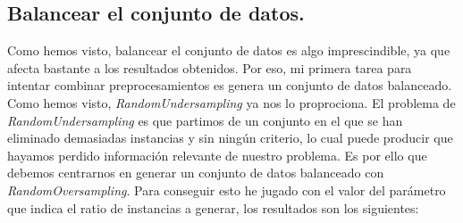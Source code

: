 \documentclass[11pt]{article}
\begin{document}
\subsection{Balancear el conjunto de datos.}

Como hemos visto, balancear el conjunto de datos es algo imprescindible, ya que afecta bastante a los resultados obtenidos. Por eso, mi primera tarea para intentar combinar preprocesamientos es genera un conjunto de datos balanceado. Como hemos visto, \textit{RandomUndersampling} ya nos lo proprociona. El problema de \textit{RandomUndersampling} es que partimos de un conjunto en el que se han eliminado demasiadas instancias y sin ningún criterio, lo cual puede producir que hayamos perdido información relevante de nuestro problema. Es por ello que debemos centrarnos en generar un conjunto de datos balanceado con \textit{RandomOversampling}. Para conseguir esto he jugado con el valor del parámetro que indica el ratio de instancias a generar, los resultados son los siguientes:

\begin{table}[H]
	\centering
\end{table}
\end{document}
